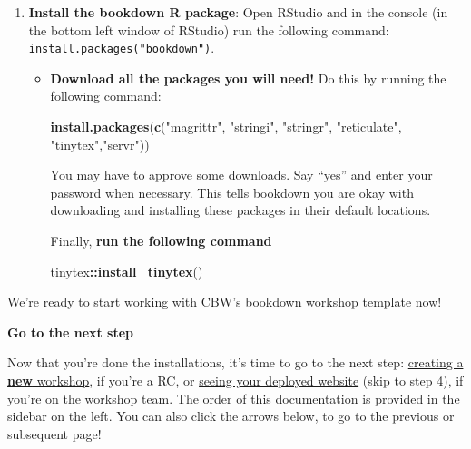 \documentclass[
]{book}
\newenvironment{Shaded}{\begin{snugshade}}{\end{snugshade}}
\newcommand{\FunctionTok}[1]{\textcolor[rgb]{0.13,0.29,0.53}{\textbf{#1}}}
\newcommand{\NormalTok}[1]{#1}
\newcommand{\SpecialCharTok}[1]{\textcolor[rgb]{0.81,0.36,0.00}{\textbf{#1}}}
\newcommand{\StringTok}[1]{\textcolor[rgb]{0.31,0.60,0.02}{#1}}
\newenvironment{bluebox}{
  \definecolor{shadecolor}{RGB}{172, 210, 237}
  \color{white}
  \begin{shaded}}
 {\end{shaded}}
\newenvironment{greenbox}{
  \definecolor{shadecolor}{RGB}{141, 181, 128}
  \color{white}
  \begin{shaded}}
 {\end{shaded}}
\theoremstyle{definition}
\theoremstyle{definition}
\theoremstyle{definition}
\theoremstyle{definition}
\theoremstyle{remark}
\begin{document}
\begin{enumerate}
\begin{greenbox}
  \end{greenbox}
\item
  \textbf{Install the bookdown R package}: Open RStudio and in the console (in the bottom left window of RStudio) run the following command: \texttt{install.packages("bookdown")}.

  \begin{itemize}
  \item
    \textbf{Download all the packages you will need!} Do this by running the following command:

\begin{Shaded}
\begin{Highlighting}[]
\FunctionTok{install.packages}\NormalTok{(}\FunctionTok{c}\NormalTok{(}\StringTok{"magrittr"}\NormalTok{, }\StringTok{"stringi"}\NormalTok{, }\StringTok{"stringr"}\NormalTok{, }\StringTok{"reticulate"}\NormalTok{, }\StringTok{"tinytex"}\NormalTok{,}\StringTok{"servr"}\NormalTok{))}
\end{Highlighting}
\end{Shaded}

    You may have to approve some downloads. Say ``yes'' and enter your password when necessary. This tells bookdown you are okay with downloading and installing these packages in their default locations.

    Finally, \textbf{run the following command}

\begin{Shaded}
\begin{Highlighting}[]
\NormalTok{tinytex}\SpecialCharTok{::}\FunctionTok{install\_tinytex}\NormalTok{()}
\end{Highlighting}
\end{Shaded}
  \end{itemize}
\end{enumerate}

We're ready to start working with CBW's bookdown workshop template now!

\begin{bluebox}

\begin{center}
\textbf{Go to the next step}

\end{center}

Now that you're done the installations, it's time to go to the next step: \hyperref[rc-workshop-setup]{creating a \textbf{new} workshop}, if you're a RC, or \hyperref[check-deploy]{seeing your deployed website} (skip to step 4), if you're on the workshop team. The order of this documentation is provided in the sidebar on the left. You can also click the arrows below, to go to the previous or subsequent page!

\end{bluebox}
\end{document}

